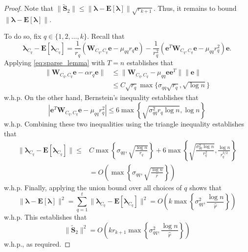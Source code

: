 \documentclass[twoside,11pt]{article}
\newcommand{\E}{\mathbf{E}}
\newcommand{\St}{\bs{\tilde S}}
\newcommand{\e}{\bs {e}}
\newcommand{\bs}{\boldsymbol}
\newcommand{\W}{\bs {W}}
\newcommand{\0}{\bs{0}}
\newcommand{\rbra}[1]{\ensuremath{\left( #1 \right)}} %
\newcommand{\bra}[1]{\ensuremath{\left\{ #1 \right\}}} %
\begin{document}
\begin{proof}
Note that $\|\St_2 \| \le  \|\bs \lambda - \E[\bs \lambda] \| \sqrt{r_{k+1}}.$
Thus, it remains to bound $\|\bs \lambda - \E[\bs \lambda] \|$.

\newcommand{\bl}{\bs{\lambda}}
To do so, fix $q \in \{1,2,\dots, k\}$. Recall that
\[
	\bl_{C_q} - \E[\bl_{C_q}] = \frac{1}{r_q} ( \W_{C_q, C_q} \e - \mu_{qq} r_q \e )
		- \frac{1}{r_q^2} (\e^T \W_{C_q, C_q} \e - \mu_{qq} r_q^2) \e.
\]
Applying \eqref{eq:sparse_lemma} with $T = n$ establishes that
\begin{align*}
	\| \W_{C_q, C_q} \e - \alpha r_q \e \| &\le  \|\W_{C_q, C_q}  - \mu_{qq} \e\e^T \| \|\e\| \\
	& \le C \sqrt{r_q} \max\{ \sigma_{qq} \sqrt{ r_q}, \sqrt{\log n} \}
\end{align*}
w.h.p.
On the other hand, Bernstein's inequality establishes that
\[
	|  \e^T \W_{C_q, C_q} \e - \mu_{qq} r_q^2 | \le 6 \max \bra{ \sqrt{\sigma_{qq}^2 r_q \log n}, \log n }
\]
w.h.p.
Combining these two inequalities using the triangle inequality establishes that
\begin{align*}
	\| \bl_{C_q} - \E[\bl_{C_q}] \| \le &C \max \bra{ \sigma_{qq}, \sqrt{\frac{\log n}{r_q } } }
		+ 6 \max \bra { \sqrt{ \frac{\sigma_{qq}^2 \log n}{r_q^2}}, \frac{\log n}{r_q^{3/2} } } \\
		&= O \rbra{ \max \bra{ \sigma_{qq}, \sqrt{ \frac{ \log n}{\hat r} } } }
\end{align*}
w.h.p.
Finally, applying the union bound over all choices of $q$ shows that
\[
	\| \bl - \E [ \bl ] \|^2 = \sum_{q=1}^t \| \bl_{C_q} - \E[\bl_{C_q}] \|^2
		= O \rbra{  k \max \bra{ \sigma_{qq}^2, \frac{\log n}{\hat r} } }
\]
w.h.p.
This establishes that
\[
	\|\St_2\|^2 = O\rbra{k r_{k+1} \max \bra{ \sigma_{qq}^2, \frac{\log n}{\hat r} } }
\]
w.h.p., as required.
\end{proof}







\end{document}
